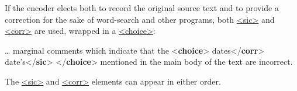 If the encoder elects both to record the original source text and to provide a correction for the sake of word-search and other programs, both \hyperref[TEI.sic]{<sic>} and \hyperref[TEI.corr]{<corr>} are used, wrapped in a \hyperref[TEI.choice]{<choice>}: \par\bgroup{}\exampleFont \begin{shaded}\noindent\mbox{}… marginal comments which indicate that the\mbox{}\newline 
{<\textbf{choice}>}\mbox{}\newline 
{}dates{</\textbf{corr}>}\mbox{}\newline 
{}date's{</\textbf{sic}>}\mbox{}\newline 
{</\textbf{choice}>} mentioned in the main body of the text are\mbox{}\newline 
 incorrect.\end{shaded}\egroup\par \noindent The \hyperref[TEI.sic]{<sic>} and \hyperref[TEI.corr]{<corr>} elements can appear in either order.\par
